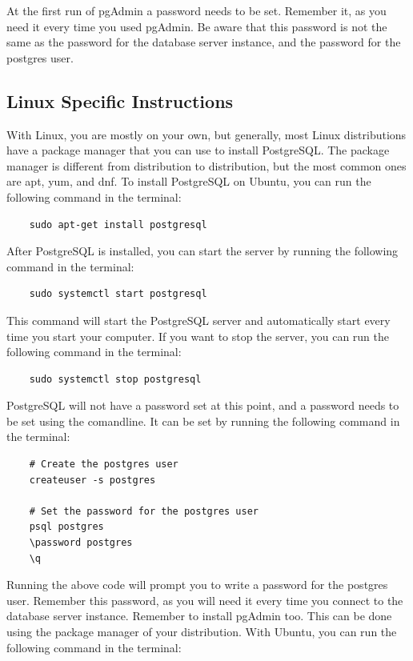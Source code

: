 At the first run of pgAdmin a password needs to be set. Remember it, as you need it every time you used pgAdmin. Be aware that this password is not the same as the password for the database server instance, and the password for the postgres user.


\subsection{Linux Specific Instructions}
With Linux, you are mostly on your own, but generally, most Linux distributions have a package manager that you can use to install PostgreSQL. The package manager is different from distribution to distribution, but the most common ones are apt, yum, and dnf. To install PostgreSQL on Ubuntu, you can run the following command in the terminal:

\begin{verbatim}
    sudo apt-get install postgresql
\end{verbatim}

After PostgreSQL is installed, you can start the server by running the following command in the terminal:

\begin{verbatim}
    sudo systemctl start postgresql
\end{verbatim}

This command will start the PostgreSQL server and automatically start every time you start your computer. If you want to stop the server, you can run the following command in the terminal:

\begin{verbatim}
    sudo systemctl stop postgresql
\end{verbatim}

PostgreSQL will not have a password set at this point, and a password needs to be set using the comandline. It can be set by running the following command in the terminal:

\begin{verbatim}
    # Create the postgres user
    createuser -s postgres

    # Set the password for the postgres user
    psql postgres
    \password postgres
    \q
\end{verbatim}

Running the above code will prompt you to write a password for the postgres user. Remember this password, as you will need it every time you connect to the database server instance. 
Remember to install pgAdmin too. This can be done using the package manager of your distribution. With Ubuntu, you can run the following command in the terminal:

